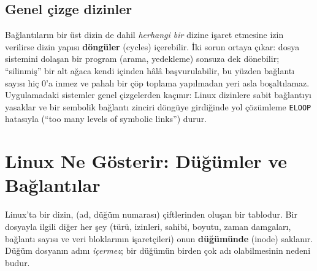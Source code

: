 \documentclass[11pt,a4paper]{article}
\newcommand{\term}[1]{\textbf{\color{mintdeep}#1}}
\begin{document}
\subsection{Genel çizge dizinler}

Bağlantıların bir üst dizin de dahil \emph{herhangi bir} dizine işaret etmesine izin verilirse dizin yapısı \term{döngüler} (cycles) içerebilir. İki sorun ortaya çıkar: dosya sistemini dolaşan bir program (arama, yedekleme) sonsuza dek dönebilir; ``silinmiş'' bir alt ağaca kendi içinden hâlâ başvurulabilir, bu yüzden bağlantı sayısı hiç $0$'a inmez ve pahalı bir çöp toplama yapılmadan yeri asla boşaltılamaz. Uygulamadaki sistemler genel çizgelerden kaçınır: Linux dizinlere sabit bağlantıyı yasaklar ve bir sembolik bağlantı zinciri döngüye girdiğinde yol çözümleme \texttt{ELOOP} hatasıyla (``too many levels of symbolic links'') durur.

\section{Linux Ne Gösterir: Düğümler ve Bağlantılar}
\label{sec:inode}

Linux'ta bir dizin, (ad, düğüm numarası) çiftlerinden oluşan bir tablodur. Bir dosyayla ilgili diğer her şey (türü, izinleri, sahibi, boyutu, zaman damgaları, bağlantı sayısı ve veri bloklarının işaretçileri) onun \term{düğümünde} (inode) saklanır. Düğüm dosyanın adını \emph{içermez}; bir düğümün birden çok adı olabilmesinin nedeni budur.
\end{document}

